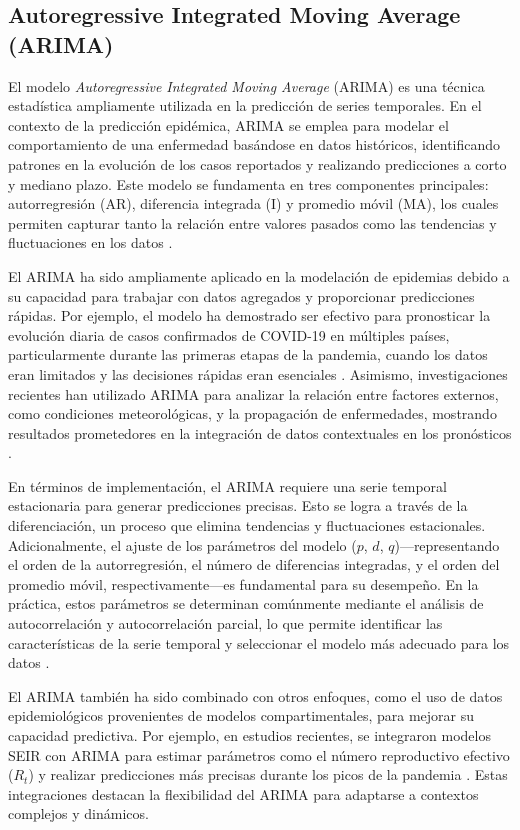 \subsection{Autoregressive Integrated Moving Average (ARIMA)}

El modelo \textit{Autoregressive Integrated Moving Average} (ARIMA) es una técnica estadística ampliamente utilizada en la predicción de series temporales. En el contexto de la predicción epidémica, ARIMA se emplea para modelar el comportamiento de una enfermedad basándose en datos históricos, identificando patrones en la evolución de los casos reportados y realizando predicciones a corto y mediano plazo. Este modelo se fundamenta en tres componentes principales: autorregresión (AR), diferencia integrada (I) y promedio móvil (MA), los cuales permiten capturar tanto la relación entre valores pasados como las tendencias y fluctuaciones en los datos \cite{AutoSEIR2020, Baccega2024}.

El ARIMA ha sido ampliamente aplicado en la modelación de epidemias debido a su capacidad para trabajar con datos agregados y proporcionar predicciones rápidas. Por ejemplo, el modelo ha demostrado ser efectivo para pronosticar la evolución diaria de casos confirmados de COVID-19 en múltiples países, particularmente durante las primeras etapas de la pandemia, cuando los datos eran limitados y las decisiones rápidas eran esenciales \cite{Nguyen2023, Baccega2024}. Asimismo, investigaciones recientes han utilizado ARIMA para analizar la relación entre factores externos, como condiciones meteorológicas, y la propagación de enfermedades, mostrando resultados prometedores en la integración de datos contextuales en los pronósticos \cite{Enhancing2024}.

En términos de implementación, el ARIMA requiere una serie temporal estacionaria para generar predicciones precisas. Esto se logra a través de la diferenciación, un proceso que elimina tendencias y fluctuaciones estacionales. Adicionalmente, el ajuste de los parámetros del modelo (\(p\), \(d\), \(q\))—representando el orden de la autorregresión, el número de diferencias integradas, y el orden del promedio móvil, respectivamente—es fundamental para su desempeño. En la práctica, estos parámetros se determinan comúnmente mediante el análisis de autocorrelación y autocorrelación parcial, lo que permite identificar las características de la serie temporal y seleccionar el modelo más adecuado para los datos \cite{MachineLearningReview2023}.

El ARIMA también ha sido combinado con otros enfoques, como el uso de datos epidemiológicos provenientes de modelos compartimentales, para mejorar su capacidad predictiva. Por ejemplo, en estudios recientes, se integraron modelos SEIR con ARIMA para estimar parámetros como el número reproductivo efectivo (\(R_t\)) y realizar predicciones más precisas durante los picos de la pandemia \cite{Baccega2024, AutoSEIR2020}. Estas integraciones destacan la flexibilidad del ARIMA para adaptarse a contextos complejos y dinámicos.

